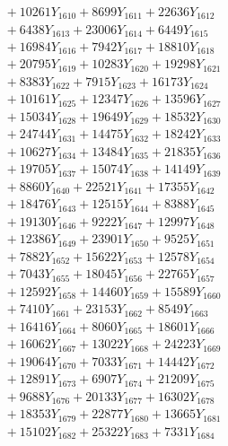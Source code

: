 \documentclass[a4paper,10pt]{article}
\begin{document}
{\begin{align}
&\;  + 10261 Y_{1610} + 8699 Y_{1611} + 22636 Y_{1612} \\[0.3ex]
&\;  + 6438 Y_{1613} + 23006 Y_{1614} + 6449 Y_{1615} \\[0.3ex]
&\;  + 16984 Y_{1616} + 7942 Y_{1617} + 18810 Y_{1618} \\[0.5ex]\allowbreak
&\;  + 20795 Y_{1619} + 10283 Y_{1620} + 19298 Y_{1621} \\[0.3ex]
&\;  + 8383 Y_{1622} + 7915 Y_{1623} + 16173 Y_{1624} \\[0.3ex]
&\;  + 10161 Y_{1625} + 12347 Y_{1626} + 13596 Y_{1627} \\[0.3ex]
&\;  + 15034 Y_{1628} + 19649 Y_{1629} + 18532 Y_{1630} \\[0.3ex]
&\;  + 24744 Y_{1631} + 14475 Y_{1632} + 18242 Y_{1633} \\[0.3ex]
&\;  + 10627 Y_{1634} + 13484 Y_{1635} + 21835 Y_{1636} \\[0.3ex]
&\;  + 19705 Y_{1637} + 15074 Y_{1638} + 14149 Y_{1639} \\[0.3ex]
&\;  + 8860 Y_{1640} + 22521 Y_{1641} + 17355 Y_{1642} \\[0.3ex]
&\;  + 18476 Y_{1643} + 12515 Y_{1644} + 8388 Y_{1645} \\[0.3ex]
&\;  + 19130 Y_{1646} + 9222 Y_{1647} + 12997 Y_{1648} \\[0.5ex]\allowbreak
&\;  + 12386 Y_{1649} + 23901 Y_{1650} + 9525 Y_{1651} \\[0.3ex]
&\;  + 7882 Y_{1652} + 15622 Y_{1653} + 12578 Y_{1654} \\[0.3ex]
&\;  + 7043 Y_{1655} + 18045 Y_{1656} + 22765 Y_{1657} \\[0.3ex]
&\;  + 12592 Y_{1658} + 14460 Y_{1659} + 15589 Y_{1660} \\[0.3ex]
&\;  + 7410 Y_{1661} + 23153 Y_{1662} + 8549 Y_{1663} \\[0.3ex]
&\;  + 16416 Y_{1664} + 8060 Y_{1665} + 18601 Y_{1666} \\[0.3ex]
&\;  + 16062 Y_{1667} + 13022 Y_{1668} + 24223 Y_{1669} \\[0.3ex]
&\;  + 19064 Y_{1670} + 7033 Y_{1671} + 14442 Y_{1672} \\[0.3ex]
&\;  + 12891 Y_{1673} + 6907 Y_{1674} + 21209 Y_{1675} \\[0.3ex]
&\;  + 9688 Y_{1676} + 20133 Y_{1677} + 16302 Y_{1678} \\[0.5ex]\allowbreak
&\;  + 18353 Y_{1679} + 22877 Y_{1680} + 13665 Y_{1681} \\[0.3ex]
&\;  + 15102 Y_{1682} + 25322 Y_{1683} + 7331 Y_{1684} \\[0.3ex]

\end{align}}
\end{document}
